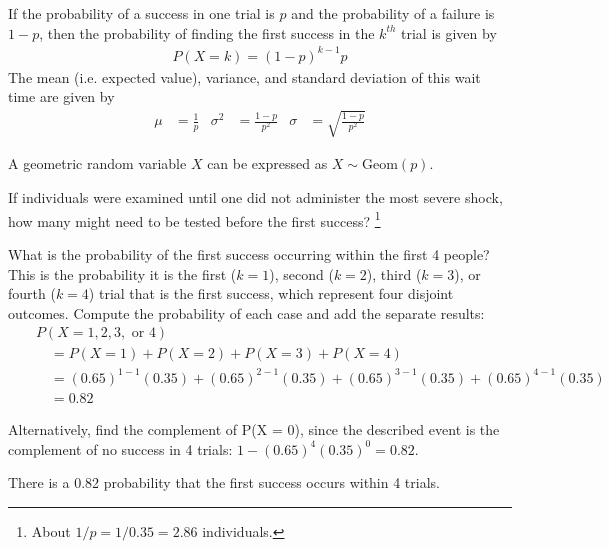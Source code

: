 \begin{termBox}{
If the probability of a success in one trial is $p$ and the probability of a failure is $1-p$, then the probability of finding the first success in the $k^{th}$ trial is given by\vspace{-1.5mm}
\begin{eqnarray*}
P(X = k) = (1-p)^{k-1}p
\end{eqnarray*}
The mean (i.e. expected value), variance, and standard deviation of this wait time are given by\vspace{-2.5mm}
\begin{align*}
\mu &= \frac{1}{p}
	&\sigma^2&=\frac{1-p}{p^2}
	&\sigma &= \sqrt{\frac{1-p}{p^2}}
\label{geomFormulas}
\end{align*}

A geometric random variable $X$ can be expressed as $X \sim \textrm{Geom}(p)$.}
\end{termBox}


\begin{exercise}
If individuals were examined until one did not administer the most severe shock, how many might need to be tested before the first success? \footnote{About $1/p = 1/0.35 = 2.86$ individuals.}
\end{exercise}

\begin{example}{What is the probability of the first success occurring within the first 4 people?} \label{marglimFirstSuccessIn4}
This is the probability it is the first ($k=1$), second ($k=2$), third ($k=3$), or fourth ($k=4$) trial that is the first success, which represent four disjoint outcomes. Compute the probability of each case and add the separate results:
\begin{eqnarray*}
&&P(X=1, 2, 3,\text{ or }4) \\
	&& \quad = P(X=1)+P(X=2)+P(X=3)+P(X=4) \\
	&& \quad = (0.65)^{1-1}(0.35) + (0.65)^{2-1}(0.35) + (0.65)^{3-1}(0.35) + (0.65)^{4-1}(0.35) \\
	&& \quad = 0.82
\end{eqnarray*}

Alternatively, find the complement of P(X = 0), since the described event is the complement of no success in 4 trials: $1 - (0.65)^{4}(0.35)^{0} = 0.82$.

There is a 0.82 probability that the first success occurs within 4 trials.
\end{example}


